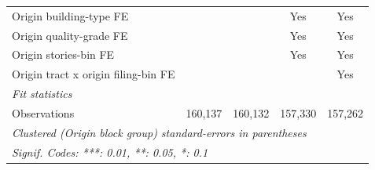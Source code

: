 \begin{tabular}{lcccc}
   Origin building-type FE                         &                &              & Yes             & Yes\\  
   Origin quality-grade FE                         &                &              & Yes             & Yes\\  
   Origin stories-bin FE                           &                &              & Yes             & Yes\\  
   Origin tract x origin filing-bin FE             &                &              &                 & Yes\\  
   \midrule
   \emph{Fit statistics}\\
   Observations                                    & 160,137        & 160,132      & 157,330         & 157,262\\  
   \midrule \midrule
   \multicolumn{5}{l}{\emph{Clustered (Origin block group) standard-errors in parentheses}}\\
   \multicolumn{5}{l}{\emph{Signif. Codes: ***: 0.01, **: 0.05, *: 0.1}}\\
\end{tabular}
\par\endgroup

